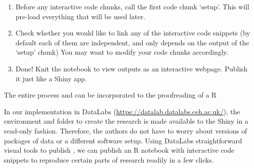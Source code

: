 \DIFdelbegin \emph{}
\DIFdelend %

\DIFaddbegin {}

\DIFaddend \begin{enumerate}
\def\labelenumi{\arabic{enumi}.}
\setcounter{enumi}{3}
\tightlist
\item
  Before any interactive code chunks, call the first code chunk `setup'.
  This will pre-load everything that will be used later.
\item
  Check whether you would like to link any of the interactive code
  snippets (by default each of them are independent, and only depends on
  the output of the `setup' chunk) You may want to modify your code
  chunks accordingly.
\item
  Done! Knit the notebook to view outputs as an interactive webpage.
  Publish it just like a Shiny app.
\end{enumerate}

The entire process \DIFdelbegin {}\DIFdelend \DIFaddbegin {}\DIFaddend and can be incorporated
to the proofreading of a R \DIFdelbegin {}\DIFdelend \DIFaddbegin {}\DIFaddend 

In our implementation in DataLabs
(\url{https://datalab.datalabs.ceh.ac.uk/}), the environment and folder
to create the research is made available to the Shiny \DIFdelbegin {}\DIFdelend \DIFaddbegin {}\DIFaddend in a read-only
fashion. Therefore, the authors do not have to worry about versions of
packages of data or a different software setup. Using DataLabs
straightforward visual tools to publish \DIFdelbegin {}\DIFdelend \DIFaddbegin {}\DIFaddend , we can publish an
R \DIFdelbegin {}\DIFdelend \DIFaddbegin {}\DIFaddend notebook with interactive code snippets to reproduce certain
parts of research readily in a few clicks.

